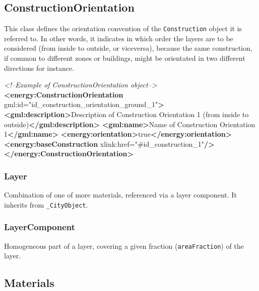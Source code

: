 \documentclass[a4paper,12pt]{article}
\newenvironment{Shaded}{}{}
\newcommand{\KeywordTok}[1]{\textcolor[rgb]{0.00,0.44,0.13}{\textbf{{#1}}}}
\newcommand{\StringTok}[1]{\textcolor[rgb]{0.25,0.44,0.63}{{#1}}}
\newcommand{\CommentTok}[1]{\textcolor[rgb]{0.38,0.63,0.69}{\textit{{#1}}}}
\newcommand{\OtherTok}[1]{\textcolor[rgb]{0.00,0.44,0.13}{{#1}}}
\newcommand{\NormalTok}[1]{{#1}}
\begin{document}
\subsection{ConstructionOrientation}\label{constructionorientation}

This class defines the orientation convention of the
\texttt{Construction} object it is referred to. In other words, it
indicates in which order the layers are to be considered (from inside to
outside, or viceversa), because the same construction, if common to
different zones or buildings, might be orientated in two different
directions for instance.

\begin{Shaded}
\begin{Highlighting}[]
\CommentTok{<!--Example of ConstructionOrientation object-->}
\KeywordTok{<energy:ConstructionOrientation}\OtherTok{ gml:id=}\StringTok{"id_construction_orientation_ground_1"}\KeywordTok{>}
    \KeywordTok{<gml:description>}\NormalTok{Description of Construction Orientation 1 (from inside to outside)}\KeywordTok{</gml:description>}
    \KeywordTok{<gml:name>}\NormalTok{Name of Construction Orientation 1}\KeywordTok{</gml:name>}
    \KeywordTok{<energy:orientation>}\NormalTok{true}\KeywordTok{</energy:orientation>}
    \KeywordTok{<energy:baseConstruction}\OtherTok{ xlink:href=}\StringTok{"#id_construction_1"}\KeywordTok{/>}
\KeywordTok{</energy:ConstructionOrientation>}
\end{Highlighting}
\end{Shaded}

\subsubsection{Layer}\label{layer}

Combination of one of more materials, referenced via a layer component.
It inherits from \texttt{\_CityObject}.

\subsubsection{LayerComponent}\label{layercomponent}

Homogeneous part of a layer, covering a given fraction
(\texttt{areaFraction}) of the layer.

\subsection{Materials}\label{materials}
\end{document}
